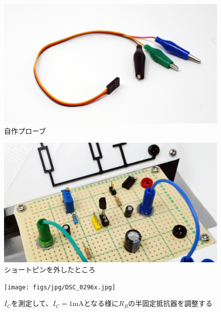 \documentclass[uplatex,a4paper,11pt,oneside,openany]{jsbook}
\begin{document}
\begin{spacing}{0.3}
  \begin{multicols}{2}
  \begin{figure}[H]
     \includegraphics[keepaspectratio, scale=0.24, angle=0]
                 {figs/jpg/DSC_0308x.jpg}
                 \caption{自作プローブ}
                 \label{fig:pic3}
  \end{figure}

  \begin{figure}[H]
     \includegraphics[keepaspectratio, scale=0.34, angle=0]
               {figs/jpg/DSC_0311x.jpg}
               \caption{ショートピンを外したところ}
               \label{fig:pic4}
  \end{figure}
  \end{multicols}
\end{spacing}

\begin{spacing}{1}
    \begin{figure}[H]
      \centering
       \texttt{[image: figs/jpg/DSC\_0296x.jpg]}
                 \caption{$I_C$を測定して、$I_C=1$mAとなる様に$R_B$の半固定抵抗器を調整する}
                 \label{fig:pic5}
    \end{figure}

\end{spacing}
\end{document}
